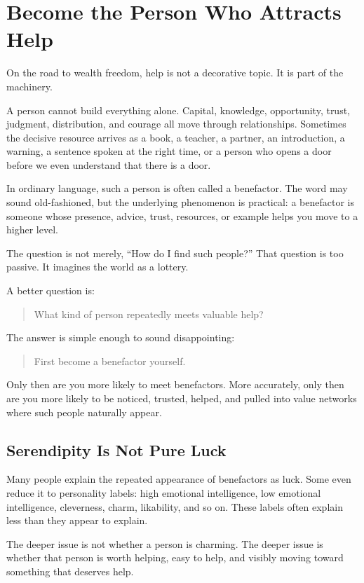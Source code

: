 \chapter{Become the Person Who Attracts Help}

On the road to wealth freedom, help is not a decorative topic. It is part of the machinery.

A person cannot build everything alone. Capital, knowledge, opportunity, trust, judgment, distribution, and courage all move through relationships. Sometimes the decisive resource arrives as a book, a teacher, a partner, an introduction, a warning, a sentence spoken at the right time, or a person who opens a door before we even understand that there is a door.

In ordinary language, such a person is often called a benefactor. The word may sound old-fashioned, but the underlying phenomenon is practical: a benefactor is someone whose presence, advice, trust, resources, or example helps you move to a higher level.

The question is not merely, ``How do I find such people?'' That question is too passive. It imagines the world as a lottery.

A better question is:

\begin{quote}
What kind of person repeatedly meets valuable help?
\end{quote}

The answer is simple enough to sound disappointing:

\begin{quote}
First become a benefactor yourself.
\end{quote}

Only then are you more likely to meet benefactors. More accurately, only then are you more likely to be noticed, trusted, helped, and pulled into value networks where such people naturally appear.

\section*{Serendipity Is Not Pure Luck}

Many people explain the repeated appearance of benefactors as luck. Some even reduce it to personality labels: high emotional intelligence, low emotional intelligence, cleverness, charm, likability, and so on. These labels often explain less than they appear to explain.

The deeper issue is not whether a person is charming. The deeper issue is whether that person is worth helping, easy to help, and visibly moving toward something that deserves help.

